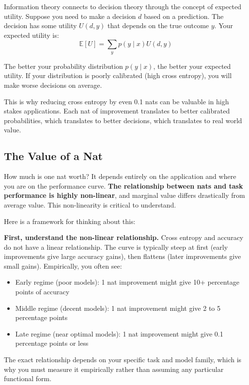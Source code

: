 Information theory connects to decision theory through the concept of expected utility. Suppose you need to make a decision $d$ based on a prediction. The decision has some utility $U(d, y)$ that depends on the true outcome $y$. Your expected utility is:
\begin{equation}
\mathbb{E}[U] = \sum_{y} p(y \mid x) U(d, y)
\end{equation}

The better your probability distribution $p(y \mid x)$, the better your expected utility. If your distribution is poorly calibrated (high cross entropy), you will make worse decisions on average.

This is why reducing cross entropy by even 0.1 nats can be valuable in high stakes applications. Each nat of improvement translates to better calibrated probabilities, which translates to better decisions, which translates to real world value.

\subsection{The Value of a Nat}

How much is one nat worth? It depends entirely on the application and where you are on the performance curve. \textbf{The relationship between nats and task performance is highly non-linear}, and marginal value differs drastically from average value. This non-linearity is critical to understand.

Here is a framework for thinking about this:

\textbf{First, understand the non-linear relationship.} Cross entropy and accuracy do not have a linear relationship. The curve is typically steep at first (early improvements give large accuracy gains), then flattens (later improvements give small gains). Empirically, you often see:

\begin{itemize}
\item Early regime (poor models): 1 nat improvement might give 10+ percentage points of accuracy
\item Middle regime (decent models): 1 nat improvement might give 2 to 5 percentage points
\item Late regime (near optimal models): 1 nat improvement might give 0.1 percentage points or less
\end{itemize}

The exact relationship depends on your specific task and model family, which is why you must measure it empirically rather than assuming any particular functional form.

